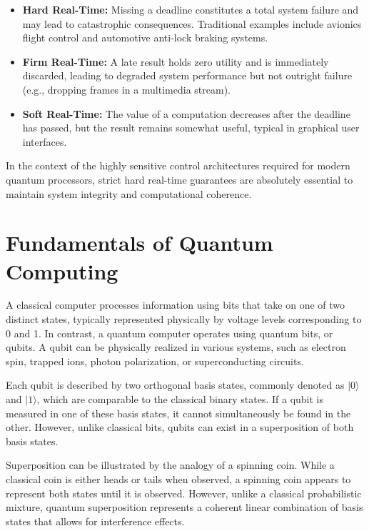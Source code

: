 \documentclass[12pt,a4paper]{article}
\begin{document}
\begin{itemize}
    \item \textbf{Hard Real-Time:} Missing a deadline constitutes a total system failure and may lead to catastrophic consequences. Traditional examples include avionics flight control and automotive anti-lock braking systems.
    \item \textbf{Firm Real-Time:} A late result holds zero utility and is immediately discarded, leading to degraded system performance but not outright failure (e.g., dropping frames in a multimedia stream).
    \item \textbf{Soft Real-Time:} The value of a computation decreases after the deadline has passed, but the result remains somewhat useful, typical in graphical user interfaces.
\end{itemize}

In the context of the highly sensitive control architectures required for modern quantum processors, strict hard real-time guarantees are absolutely essential to maintain system integrity and computational coherence.
\section{Fundamentals of Quantum Computing}

A classical computer processes information using bits that take on one of two distinct states, 
typically represented physically by voltage levels corresponding to 0 and 1. 
In contrast, a quantum computer operates using quantum bits, or qubits.
A qubit can be physically realized in various systems, such as electron spin, trapped ions, photon polarization, or superconducting circuits.

Each qubit is described by two orthogonal basis states, commonly denoted as $\lvert 0 \rangle$ and $\lvert 1 \rangle$, 
which are comparable to the classical binary states. 
If a qubit is measured in one of these basis states, it cannot simultaneously be found in the other. 
However, unlike classical bits, qubits can exist in a superposition of both basis states.

Superposition can be illustrated by the analogy of a spinning coin. 
While a classical coin is either heads or tails when observed, a spinning coin appears to represent both states until it is observed. 
However, unlike a classical probabilistic mixture, quantum superposition represents a coherent linear combination of basis states that allows for interference effects.
\end{document}
